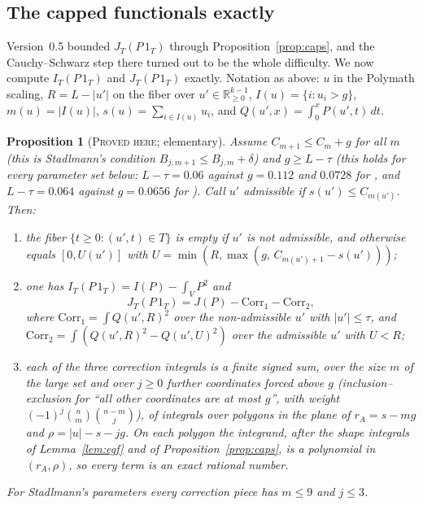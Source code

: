 \documentclass[11pt]{amsart}
\newtheorem{proposition}[theorem]{Proposition}
\theoremstyle{definition}
\theoremstyle{remark}
\newcommand{\lbl}[1]{\textup{\textsc{#1}}}
\begin{document}
\subsection*{The capped functionals exactly}
Version~0.5 bounded $J_T(P\,1_T)$ through Proposition~\ref{prop:caps}, and the
Cauchy--Schwarz step there turned out to be the whole difficulty. We now
compute $I_T(P\,1_T)$ and $J_T(P\,1_T)$ exactly. Notation as above: $u$ in the
Polymath scaling, $R=L-|u'|$ on the fiber over $u'\in\mathbb R_{\ge0}^{k-1}$,
$I(u)=\{i:u_i>g\}$, $m(u)=|I(u)|$, $s(u)=\sum_{i\in I(u)}u_i$, and
$Q(u',x)=\int_0^xP(u',t)\,dt$.

\begin{proposition}[\lbl{Proved here}; elementary]\label{prop:exact}
Assume $C_{m+1}\le C_m+g$ for all $m$ (this is Stadlmann's condition
$B_{j,m+1}\le B_{j,m}+\delta$) and $g\ge L-\tau$ (this holds for every
parameter set below: $L-\tau=0.06$ against $g=0.112$ and $0.0728$ for
\cite{Sta26,Kin26}, and $L-\tau=0.064$ against $g=0.0656$ for \cite{Cha26}). Call $u'$ \emph{admissible} if $s(u')\le
C_{m(u')}$. Then:
\begin{enumerate}
\item the fiber $\{t\ge0:(u',t)\in T\}$ is empty if $u'$ is not admissible,
and otherwise equals $[0,U(u')]$ with
$U=\min\left(R,\max(g,\,C_{m(u')+1}-s(u'))\right)$;
\item one has $I_T(P\,1_T)=I(P)-\int_VP^2$ and
\[J_T(P\,1_T)=J(P)-\mathrm{Corr}_1-\mathrm{Corr}_2,\]
where
$\mathrm{Corr}_1=\int Q(u',R)^2$ over the non-admissible $u'$ with
$|u'|\le\tau$, and
$\mathrm{Corr}_2=\int\left(Q(u',R)^2-Q(u',U)^2\right)$ over the admissible $u'$ with $U<R$;
\item each of the three correction integrals is a finite signed sum, over the
size $m$ of the large set and over $j\ge0$ further coordinates forced above
$g$ (inclusion--exclusion for ``all other coordinates are at most $g$'', with
weight $(-1)^j\binom nm\binom{n-m}{j}$), of integrals over polygons in the
plane of $r_A=s-mg$ and $\rho=|u|-s-jg$. On each polygon the integrand,
after the shape integrals of Lemma~\ref{lem:egf} and of
Proposition~\ref{prop:caps}, is a polynomial in $(r_A,\rho)$, so every term
is an exact rational number.
\end{enumerate}
For Stadlmann's parameters every correction piece has $m\le9$ and $j\le3$.
\end{proposition}
\end{document}
